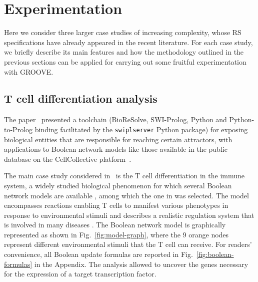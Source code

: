 
\section{Experimentation}\label{sec:experiments}

Here we consider three larger case studies of increasing complexity, whose RS specifications have already appeared in the recent literature. For each case study, we briefly describe its main features and how the methodology outlined in the previous sections can be applied for carrying out some fruitful experimentation with GROOVE.

\subsection{T cell differentiation analysis}

The paper~\cite{datamod2023} presented a toolchain (BioReSolve, SWI-Prolog, Python and Python-to-Prolog binding facilitated by the \verb=swiplserver= Python package) for exposing  biological entities that are responsible for reaching certain attractors, with applications to Boolean network models like those available in the public database on the CellCollective platform~\cite{helikar2012cell}. 

The main case study considered in~\cite{datamod2023} is the T cell differentiation in the immune system, a widely studied biological phenomenon for which several Boolean network models are available \cite{saez2007logical,thakar2010boolean,puniya2018mechanistic}, among which the one in \cite{puniya2018mechanistic} was selected. The model encompasses reactions enabling T cells to manifest various phenotypes in response to environmental stimuli and describes a realistic regulation system that is involved in many diseases \cite{lafaille1998role,hirahara2016cd4+,meng2016regulatory}.
The Boolean network model is graphically represented as shown in Fig.~\ref{fig:model-graph}, where the 9 orange nodes represent different environmental stimuli that the T cell can receive. %
For readers' convenience, all Boolean update formulas are reported in Fig.~\ref{fig:boolean-formulas} in the Appendix. 
The analysis allowed to uncover the genes necessary for the expression of a target transcription factor.

